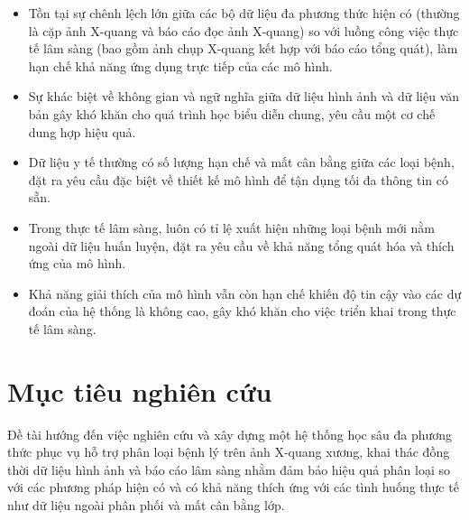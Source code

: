 \begin{itemize}
    \item Tồn tại sự chênh lệch lớn giữa các bộ dữ liệu đa phương thức hiện có (thường là cặp ảnh X-quang và báo cáo đọc ảnh X-quang)
so với luồng công việc thực tế lâm sàng (bao gồm ảnh chụp X-quang kết hợp với báo cáo tổng quát), làm hạn chế khả năng ứng dụng trực tiếp của các mô hình.
    \item Sự khác biệt về không gian và ngữ nghĩa giữa dữ liệu hình ảnh và dữ liệu văn bản gây khó khăn cho quá trình học biểu diễn chung, yêu cầu một cơ chế dung hợp hiệu quả.
    \item Dữ liệu y tế thường có số lượng hạn chế và mất cân bằng giữa các loại bệnh, đặt ra yêu cầu đặc biệt về thiết kế mô hình để tận dụng tối đa thông tin có sẵn.
    \item Trong thực tế lâm sàng, luôn có tỉ lệ xuất hiện những loại bệnh mới nằm ngoài dữ liệu huấn luyện, đặt ra yêu cầu về khả năng tổng quát hóa và thích ứng của mô hình.
    \item Khả năng giải thích của mô hình vẫn còn hạn chế khiến độ tin cậy vào các dự đoán của hệ thống là không cao, gây khó khăn cho việc triển khai trong thực tế lâm sàng.
\end{itemize}

\section{Mục tiêu nghiên cứu}
Đề tài hướng đến việc nghiên cứu và xây dựng một hệ thống học sâu đa phương thức phục vụ hỗ trợ phân loại bệnh lý trên ảnh X-quang xương, khai thác đồng thời dữ liệu hình ảnh và báo cáo lâm sàng nhằm đảm bảo hiệu quả phân loại so với các phương pháp hiện có và có khả năng thích ứng với các tình huống thực tế như dữ liệu ngoài phân phối và mất cân bằng lớp.


